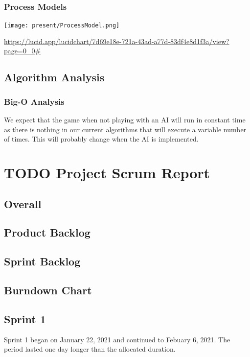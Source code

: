 \documentclass[11pt]{article}
\begin{document}
\subsubsection{Process Models}
\label{sec:orgd94a977}
\begin{center}
\texttt{[image:  present/ProcessModel.png]}
\end{center}
\url{https://lucid.app/lucidchart/7d69e18e-721a-43ad-a77d-83df4e8d1f3a/view?page=0\_0\#}
\subsection{Algorithm Analysis}
\label{sec:orgf8d9719}
\subsubsection{Big-O Analysis}
\label{sec:orgad44236}
We expect that the game when not playing with an AI will run in
constant time as there is nothing in our current algorithms that
will execute a variable number of times. This will probably change
when the AI is implemented.

\section{{\bfseries\sffamily TODO} Project Scrum Report}
\label{sec:orgaab572c}
\subsection{Overall}
\label{sec:org751c929}
\subsection{Product Backlog}
\label{sec:org3a8e076}
\subsection{Sprint Backlog}
\label{sec:orgca82dbb}
\subsection{Burndown Chart}
\label{sec:org6e38130}
\subsection{Sprint 1}
\label{sec:orgb49d24d}
Sprint 1 began on January 22, 2021 and continued to Febuary
6, 2021. The period lasted one day longer than the allocated duration.
\end{document}

